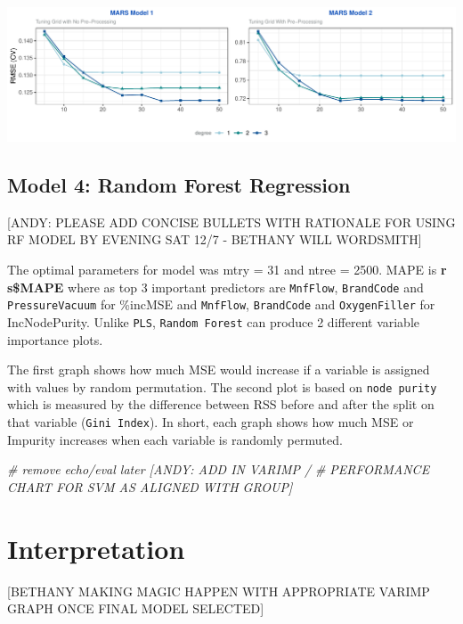 \documentclass[]{report}
\newenvironment{Shaded}{\begin{snugshade}}{\end{snugshade}}
\newcommand{\CommentTok}[1]{\textcolor[rgb]{0.56,0.35,0.01}{\textit{#1}}}
\begin{document}
\includegraphics{CONFLICT_Project_Update_files/figure-latex/unnamed-chunk-11-1.pdf}

\hypertarget{model-4-random-forest-regression}{%
\section{Model 4: Random Forest
Regression}\label{model-4-random-forest-regression}}

{[}ANDY: PLEASE ADD CONCISE BULLETS WITH RATIONALE FOR USING RF MODEL BY
EVENING SAT 12/7 - BETHANY WILL WORDSMITH{]}

The optimal parameters for model was mtry = 31 and ntree = 2500. MAPE is
\textbf{r s\$MAPE} where as top 3 important predictors are
\texttt{MnfFlow}, \texttt{BrandCode} and \texttt{PressureVacuum} for
\%incMSE and \texttt{MnfFlow}, \texttt{BrandCode} and
\texttt{OxygenFiller} for IncNodePurity. Unlike \texttt{PLS},
\texttt{Random\ Forest} can produce 2 different variable importance
plots.

The first graph shows how much MSE would increase if a variable is
assigned with values by random permutation. The second plot is based on
\texttt{node\ purity} which is measured by the difference between RSS
before and after the split on that variable (\texttt{Gini\ Index}). In
short, each graph shows how much MSE or Impurity increases when each
variable is randomly permuted.

\begin{Shaded}
\begin{Highlighting}[]
\CommentTok{# remove echo/eval later [ANDY: ADD IN VARIMP /}
\CommentTok{# PERFORMANCE CHART FOR SVM AS ALIGNED WITH GROUP]}
\end{Highlighting}
\end{Shaded}

\hypertarget{interpretation}{%
\chapter{Interpretation}\label{interpretation}}

{[}BETHANY MAKING MAGIC HAPPEN WITH APPROPRIATE VARIMP GRAPH ONCE FINAL
MODEL SELECTED{]}
\end{document}
